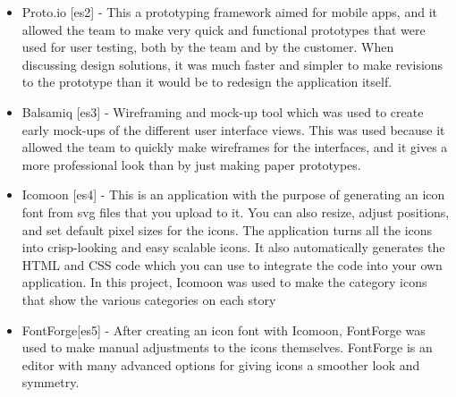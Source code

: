 \begin{itemize}
	\item Proto.io [es2] - This a prototyping framework aimed for mobile apps, and it allowed the team to make very quick and functional prototypes that were used for user testing, both by the team and by the customer. When discussing design solutions, it was much faster and simpler to make revisions to the prototype than it would be to redesign the application itself. 
	\item Balsamiq [es3] - Wireframing and mock-up tool which was used to create early mock-ups of the different user interface views. This was used because it allowed the team to quickly make wireframes for the interfaces, and it gives a more professional look than by  just making paper prototypes.
	\item Icomoon [es4] - This is an application with the purpose of generating an icon font from svg files that you upload to it. You can also resize, adjust positions, and set default pixel sizes for the icons. The application turns all the icons into crisp-looking and easy scalable icons. It also automatically generates the HTML and CSS code which you can use to integrate the code into your own application. In this project, Icomoon was used to make the category icons that show the various categories on each story
	\item FontForge[es5] - After creating an icon font with Icomoon, FontForge was used to make manual adjustments to the icons themselves. FontForge is an editor with many advanced options for giving icons a smoother look and symmetry.\newline 	
\end{itemize}

